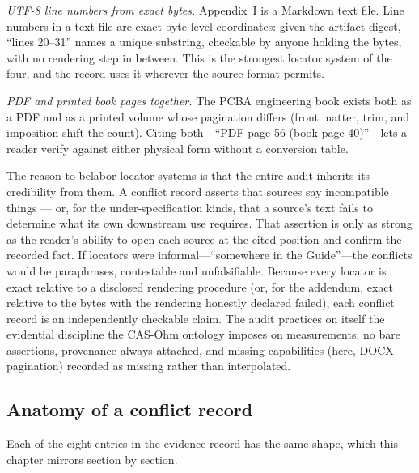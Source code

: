 \emph{UTF-8 line numbers from exact bytes.} Appendix~I is a Markdown text
file. Line numbers in a text file are exact byte-level coordinates: given the
artifact digest, ``lines 20--31'' names a unique substring, checkable by
anyone holding the bytes, with no rendering step in between. This is the
strongest locator system of the four, and the record uses it wherever the
source format permits.

\emph{PDF and printed book pages together.} The PCBA engineering book exists
both as a PDF and as a printed volume whose pagination differs (front matter,
trim, and imposition shift the count). Citing both---``PDF page 56 (book page
40)''---lets a reader verify against either physical form without a
conversion table.

\begin{remark}\label{ch04:rem:locators}
The reason to belabor locator systems is that the entire audit inherits its
credibility from them. A conflict record asserts that sources say incompatible things --- or, for
the under-specification kinds, that a source's text fails to determine what
its own downstream use requires. That assertion is only as strong as the reader's ability
to open each source at the cited position and confirm the recorded fact. If
locators were informal---``somewhere in the Guide''---the conflicts would be
paraphrases, contestable and unfalsifiable. Because every locator is exact
relative to a disclosed rendering procedure (or, for the addendum, exact
relative to the bytes with the rendering honestly declared failed), each
conflict record is an independently checkable claim. The audit practices on
itself the evidential discipline the CAS-Ohm ontology imposes on
measurements: no bare assertions, provenance always attached, and missing
capabilities (here, DOCX pagination) recorded as missing rather than
interpolated.
\end{remark}

\subsection{Anatomy of a conflict record}\label{ch04:anatomy}

Each of the eight entries in the evidence record has the same shape, which
this chapter mirrors section by section.

